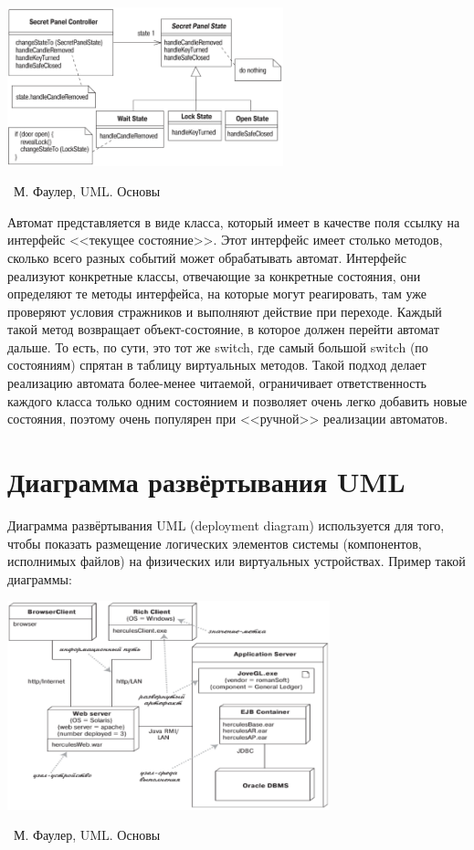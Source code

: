 \documentclass[a5paper]{article}
\newcommand{\attribution}[1] {
    \vspace{-5mm}\begin{flushright}\begin{scriptsize}%
    {\textcopyright\, #1}\end{scriptsize}\end{flushright}
}
\begin{document}
\begin{center}
    \includegraphics[width=0.6\textwidth]{stateTransitionStatePattern.png}
    \attribution{М. Фаулер, UML. Основы}
\end{center}

Автомат представляется в виде класса, который имеет в качестве поля ссылку на интерфейс <<текущее состояние>>. Этот интерфейс имеет столько методов, сколько всего разных событий может обрабатывать автомат. Интерфейс реализуют конкретные классы, отвечающие за конкретные состояния, они определяют те методы интерфейса, на которые могут реагировать, там уже проверяют условия стражников и выполняют действие при переходе. Каждый такой метод возвращает объект-состояние, в которое должен перейти автомат дальше. То есть, по сути, это тот же switch, где самый большой switch (по состояниям) спрятан в таблицу виртуальных методов. Такой подход делает реализацию автомата более-менее читаемой, ограничивает ответственность каждого класса только одним состоянием и позволяет очень легко добавить новые состояния, поэтому очень популярен при <<ручной>> реализации автоматов.

\section{Диаграмма развёртывания UML}

Диаграмма развёртывания UML (deployment diagram) используется для того, чтобы показать размещение логических элементов системы (компонентов, исполнимых файлов) на физических или виртуальных устройствах. Пример такой диаграммы:

\begin{center}
    \includegraphics[width=0.7\textwidth]{deploymentDiagram.png}
    \attribution{М. Фаулер, UML. Основы}
\end{center}
\end{document}
